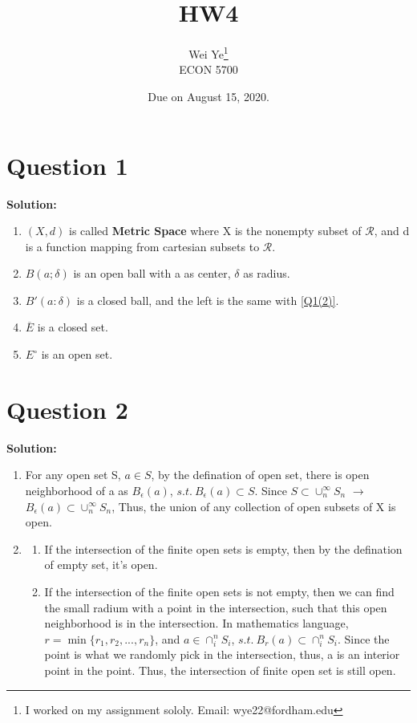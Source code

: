\documentclass[11pt]{article} %
\title{HW4}
\author{Wei Ye\footnote{I worked on my assignment sololy. Email: wye22@fordham.edu}  	\\
	ECON 5700}
\date{Due on August 15, 2020.}
\begin{document}
	\maketitle
	\section{Question 1}
\textbf{Solution:}

\begin{enumerate}
	\item $(X,d)$ is called \textbf{Metric Space} where X is the nonempty subset of $\mathcal{R}$, and d is a function mapping from cartesian subsets to $\mathcal{R}$.
	\item $B(a;\delta)$ is an open ball with a as center, $\delta$ as radius. \label{Q1(2)}
	\item $B'(a: \delta)$ is a closed ball, and the left is the  same with \ref{Q1(2)}.
	\item $\overline{E}$ is a closed set.
	\item $E^{\circ}$ is an open set. 
	
\end{enumerate}

\section{Question 2}
\textbf{Solution:}

\begin{enumerate}
	\item For any open set S, $a\in S$, by the defination of open set, there is open neighborhood of a as $B_{\epsilon}(a)$, $s.t. \  B_{\epsilon}(a) \subset S$. Since $S\subset \cup_n^\infty S_n$  $\longrightarrow$ $  B_{\epsilon}(a) \subset \cup_n^\infty S_n$, Thus, the union of any collection of open subsets of X is open. 
	\item 
	\begin{enumerate}
		\item If the intersection of the finite open sets is empty, then by the defination of empty set, it's open. 
		\item If the intersection of the finite open sets is not empty, then we can find the small radium with a point in the intersection, such that this open neighborhood is in the intersection. In mathematics language, $r=\min \{r_1,r_2,..., r_n\}$, and $a\in \cap_i^nS_i$, $s.t. \ B_r(a)\subset \cap_i^nS_i$. Since the point is what we randomly pick in the intersection, thus, a is an interior point in the point. Thus, the intersection of finite open set is still open. 
	\end{enumerate}
\end{enumerate}
	
\end{document}

